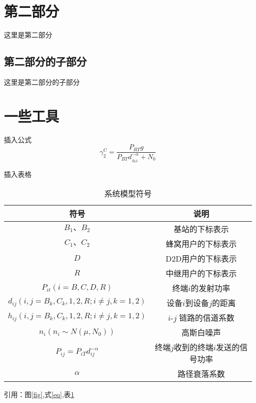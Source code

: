 \documentclass[UTF8,a4paper,12pt]{ctexart}
\newcommand{\wuhao}{\fontsize{10.5pt}{10.5pt}\selectfont}
\begin{document}
\section{第二部分}
这里是第二部分
\subsection{第二部分的子部分}
这里是第二部分的子部分
 
\section{一些工具}
插入公式
\begin{equation}\label{eq}
  \gamma _2^{\text{C}} = \frac{{{P_{RT}}g}}{{{P_{BT}}d_{_{{B_2}2}}^{ - \alpha } + {N_0}}}
\end{equation}
 
 
插入表格
\begin{table}[H] \wuhao             %
   \centering
  \caption{系统模型符号}\label{tab}
  \begin{tabular}{c|c}
    \toprule                  %
    符号 & 说明 \\
    \hline                  %
    ${{B_1}\mbox{、}{B_2}}$ & 基站的下标表示 \\
    ${C_1}\mbox{、}{C_2}$ & 蜂窝用户的下标表示 \\
    $D$ & D2D用户的下标表示 \\
    $R$ & 中继用户的下标表示 \\
    ${P_{it}}\left( {i = B,C,D,R} \right)$ & 终端$i$的发射功率 \\
    ${d_{ij}}(i,j = {B_k},{C_k},1,2,R;i \ne j,k = 1,2)$ & 设备$i$到设备$j$的距离 \\
    ${h_{ij}}(i,j = {B_k},{C_k},1,2,R;i \ne j,k = 1,2)$ &$i$-$j$ 链路的信道系数\\
    ${n_i}\left( {{n_i}\sim N\left( {\mu ,{N_0}} \right)} \right)$ & 高斯白噪声 \\
    ${P_{ij}} = {P_{iT}}d_{ij}^{ - \alpha }$ & 终端$j$收到的终端$i$发送的信号功率\\
    $\alpha$ & 路径衰落系数 \\
    \bottomrule                %
  \end{tabular}
\end{table}
 
引用：图\ref{fig},式\eqref{eq},表\ref{tab}
 
\end{document}
